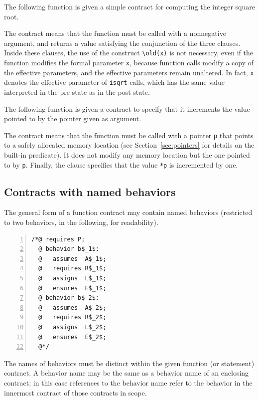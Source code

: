 \begin{example}
  The following function is given a simple contract for computing
  the integer square root.

%
  The contract means that the function must be called with a
  nonnegative argument, and returns a value satisfying
  the conjunction of the three \ensures{} clauses.
  Inside these \ensures{} clauses, the use of the construct \lstinline|\old(x)|
  is not necessary, even if the function modifies the formal
  parameter
  \lstinline|x|, because function calls modify a copy of the effective parameters,
  and the effective parameters remain unaltered.  In fact, \lstinline|x| denotes
  the effective parameter of \lstinline|isqrt| calls, which has the same value
  interpreted in the pre-state as in the post-state.

\end{example}

\begin{example}
  The following function is given a contract to specify that it increments
  the value pointed to by the pointer given as argument.

%
  The contract means that the function must be called with a pointer
  \lstinline|p| that points to a safely allocated memory location (see
  Section~\ref{sec:pointers} for details on the \valid built-in
  predicate). It does not modify any memory location but the one
  pointed to by \lstinline|p|. Finally, the \ensures clause specifies that
  the value \lstinline!*p! is incremented by one.
\end{example}

\subsection{Contracts with named behaviors}
\label{subsec:behaviors}
The general form of a function contract may contain named
behaviors (restricted to two behaviors, in the following, for
readability).
\lstset{firstnumber=auto}
\begin{lstlisting}[style=c,basicstyle=\lp@basic,numbers=left,name=behaviors]
/*@ requires P;
  @ behavior b$_1$:
  @   assumes  A$_1$;
  @   requires R$_1$;
  @   assigns  L$_1$;
  @   ensures  E$_1$;
  @ behavior b$_2$:
  @   assumes  A$_2$;
  @   requires R$_2$;
  @   assigns  L$_2$;
  @   ensures  E$_2$;
  @*/
\end{lstlisting}
The names of behaviors must be distinct within the given function (or statement) contract. A behavior name may be the same as a behavior name
of an enclosing contract; in this case references to the behavior name
refer to the behavior in the innermost contract of those contracts in scope.


